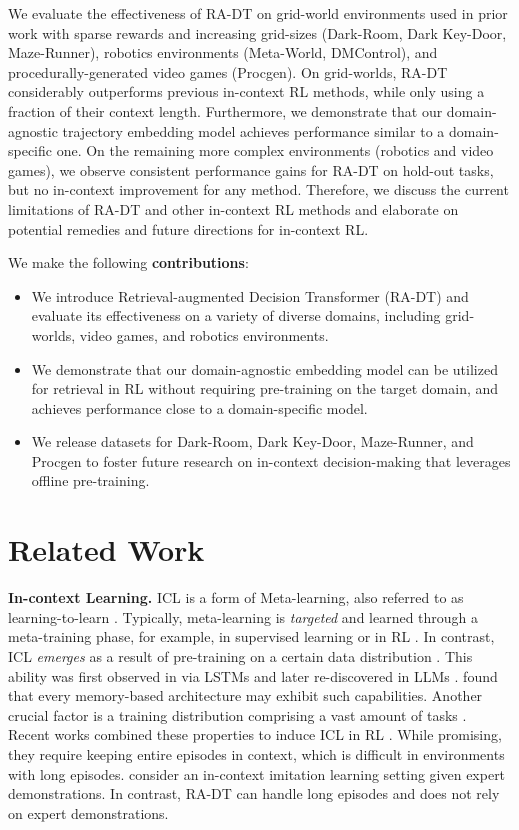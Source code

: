 \documentclass{article} %
\begin{document}
We evaluate the effectiveness of RA-DT on grid-world environments used in prior work with sparse rewards and increasing grid-sizes (Dark-Room, Dark Key-Door, Maze-Runner),  robotics environments (Meta-World, DMControl), and procedurally-generated video games (Procgen). 
On grid-worlds, RA-DT considerably outperforms previous in-context RL methods, while only using a fraction of their context length.
Furthermore, we demonstrate that our domain-agnostic trajectory embedding model achieves performance similar to a domain-specific one.
On the remaining more complex environments (robotics and video games), we observe consistent performance gains for RA-DT on hold-out tasks, but no in-context improvement for any method.
Therefore, we discuss the current limitations of RA-DT and other in-context RL methods and elaborate on potential remedies and future directions for in-context RL.

We make the following \textbf{contributions}:
\begin{itemize}
    \item We introduce Retrieval-augmented Decision Transformer (RA-DT) and evaluate its effectiveness on a variety of diverse domains, including grid-worlds, video games, and robotics environments. 
    \item We demonstrate that our domain-agnostic embedding model can be utilized for retrieval in RL without requiring pre-training on the target domain, and achieves performance close to a domain-specific model.
    \item We release datasets for Dark-Room, Dark Key-Door, Maze-Runner, and Procgen to foster future research on in-context decision-making that leverages offline pre-training.%
\end{itemize}


\section{Related Work}\label{sec:relatedwork}
\textbf{In-context Learning.}
ICL is a form of Meta-learning, also referred to as learning-to-learn \citep{Schmidhuber:87}.
Typically, meta-learning is \emph{targeted} and learned through a meta-training phase, for example, in supervised learning \citep{Santoro:16,Mishra:18,Finn:17} or in RL \citep{Wang:16,Duan:16,Kirsch:19,Flennerhag:19}.
In contrast, ICL \emph{emerges} as a result of pre-training on a certain data distribution \citep{Chan:22}.
This ability was first observed in \citet{Hochreiter:01} via LSTMs \citep{Hochreiter:97} and later re-discovered in LLMs \citep{Brown:20}.
\citet{Ortega:2019} found that every memory-based architecture may exhibit such capabilities. 
Another crucial factor is a training distribution comprising a vast amount of tasks \citep{Chan:22,Kirsch:22}.
Recent works combined these properties to induce ICL in RL  \citep{Laskin:22,Lee:22,Kirsch:23}.
While promising, they require keeping entire episodes in context, which is difficult in environments with long episodes.
\citet{Raparthy:23} consider an in-context imitation learning setting given expert demonstrations. 
In contrast, RA-DT can handle long episodes and does not rely on expert demonstrations.
\end{document}
